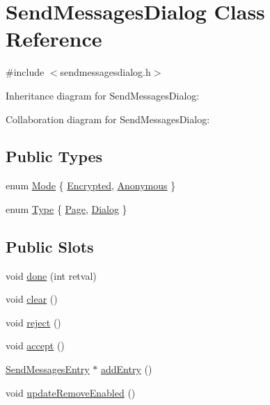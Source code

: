 \hypertarget{class_send_messages_dialog}{}\section{Send\+Messages\+Dialog Class Reference}
\label{class_send_messages_dialog}


{\ttfamily \#include $<$sendmessagesdialog.\+h$>$}



Inheritance diagram for Send\+Messages\+Dialog\+:


Collaboration diagram for Send\+Messages\+Dialog\+:
\subsection*{Public Types}
\begin{DoxyCompactItemize}
\item 
enum \hyperlink{class_send_messages_dialog_aa123d2b61a8bd27c054469a331d69c43}{Mode} \{ \hyperlink{class_send_messages_dialog_aa123d2b61a8bd27c054469a331d69c43a083da80ff3b2e7b71b2c26a8b4a8982e}{Encrypted}, 
\hyperlink{class_send_messages_dialog_aa123d2b61a8bd27c054469a331d69c43a9694f2bb3a95d29f2c20c27effcb292c}{Anonymous}
 \}
\item 
enum \hyperlink{class_send_messages_dialog_ae5855bcf6efac64a72d85546f1cabc35}{Type} \{ \hyperlink{class_send_messages_dialog_ae5855bcf6efac64a72d85546f1cabc35a6589a50ad77af9037b71f641e044e5da}{Page}, 
\hyperlink{class_send_messages_dialog_ae5855bcf6efac64a72d85546f1cabc35a5f0ef29c027d54a2e0309ad07e01efcd}{Dialog}
 \}
\end{DoxyCompactItemize}
\subsection*{Public Slots}
\begin{DoxyCompactItemize}
\item 
void \hyperlink{class_send_messages_dialog_a39929b11f0516f1360a36dcfaa9ae38e}{done} (int retval)
\item 
void \hyperlink{class_send_messages_dialog_abd621460aeabc209648050bab5bf16f9}{clear} ()
\item 
void \hyperlink{class_send_messages_dialog_a9a676cf7ce3b8d0c0996366d651cf77d}{reject} ()
\item 
void \hyperlink{class_send_messages_dialog_a0fbe14e62f3ef38beec76dae64f0fd25}{accept} ()
\item 
\hyperlink{class_send_messages_entry}{Send\+Messages\+Entry} $\ast$ \hyperlink{class_send_messages_dialog_a82e310529e39f9e62a25f0df233c6be7}{add\+Entry} ()
\item 
void \hyperlink{class_send_messages_dialog_a33a21b7d103330c784e6dc5590d7a2c4}{update\+Remove\+Enabled} ()
\end{DoxyCompactItemize}
